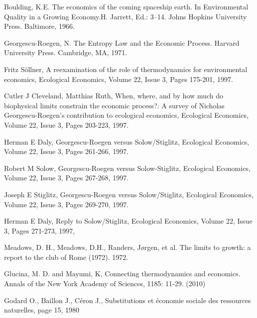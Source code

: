 \documentclass[12pt,a4paper]{article}%
\begin{document}
\begin{thebibliography}{99}                                                                                               %
Boulding, K.E. The economics of the coming spaceship
earth. In Environmental Quality in a Growing Economy.H. Jarrett, Ed.: 3--14.
Johns Hopkins University Press. Baltimore, 1966.

Georgescu-Roegen, N. The Entropy Law and the Economic
Process. Harvard University Press. Cambridge, MA, 1971.

Fritz S\"ollner, A reexamination of the role of
thermodynamics for environmental economics, Ecological Economics, Volume 22,
Issue 3, Pages 175-201, 1997.

Cutler J Cleveland, Matthias Ruth, When, where, and by
how much do biophysical limits constrain the economic process?: A survey of
Nicholas Georgescu-Roegen's contribution to ecological economics, Ecological
Economics, Volume 22, Issue 3, Pages 203-223, 1997.

Herman E Daly, Georgescu-Roegen versus Solow/Stiglitz,
Ecological Economics, Volume 22, Issue 3, Pages 261-266, 1997.

Robert M Solow, Georgescu-Roegen versus Solow-Stiglitz,
Ecological Economics, Volume 22, Issue 3, Pages 267-268, 1997.

Joseph E Stiglitz, Georgescu-Roegen versus
Solow/Stiglitz, Ecological Economics, Volume 22, Issue 3, Pages 269-270, 1997.

Herman E Daly, Reply to Solow/Stiglitz, Ecological
Economics, Volume 22, Issue 3, Pages 271-273, 1997,

Meadows, D. H., Meadows, D.H., Randers, J\o rgen, et al.
The limits to growth: a report to the club of Rome (1972). 1972.

Glucina, M. D. and Mayumi, K, Connecting thermodynamics
and economics. Annals of the New York Academy of Sciences, 1185: 11-29. (2010)

Godard O., Baillon J., Céron J., Substitutions et
économie sociale des ressources naturelles, page 15, 1980
\end{thebibliography}
\end{document}
